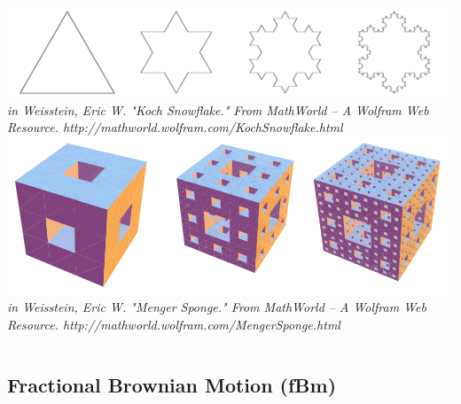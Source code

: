 \documentclass[aspectratio=169]{beamer}
\newenvironment{myframe}[1][t]{\begin{frame}[#1]{\secname}{\subsecname}}{\end{frame}}
\begin{document}
	\begin{myframe}
		\begin{columns}[t]
			\begin{column}[t]{0.6\linewidth}
				\centering
				\includegraphics[align=t, width=0.7\linewidth]{images/background/fractals/koch} \\[0.5em]
				\tiny\textit{in Weisstein, Eric W. "Koch Snowflake." From MathWorld -- A Wolfram Web Resource. http://mathworld.wolfram.com/KochSnowflake.html} \\ [1.5em]
				\includegraphics[align=t, width=0.7\linewidth]{images/background/fractals/sponge} \\[0.5em]
				\tiny\textit{in Weisstein, Eric W. "Menger Sponge." From MathWorld -- A Wolfram Web Resource. http://mathworld.wolfram.com/MengerSponge.html}
			\end{column}
		\end{columns}
		
		
	\end{myframe}
	
	\subsection{Fractional Brownian Motion (fBm)}
	
\end{document}
